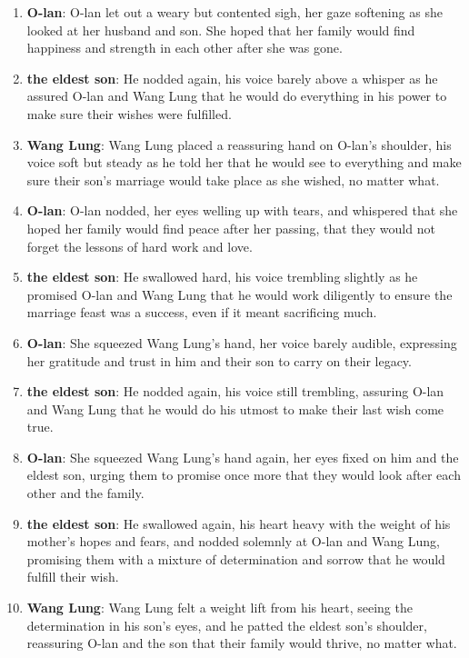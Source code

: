 \documentclass[10pt]{article}
\begin{document}
\begin{enumerate}
\item \textbf{O-lan}: O-lan let out a weary but contented sigh, her gaze softening as she looked at her husband and son. She hoped that her family would find happiness and strength in each other after she was gone.

\item \textbf{the eldest son}: He nodded again, his voice barely above a whisper as he assured O-lan and Wang Lung that he would do everything in his power to make sure their wishes were fulfilled.

\item \textbf{Wang Lung}: Wang Lung placed a reassuring hand on O-lan's shoulder, his voice soft but steady as he told her that he would see to everything and make sure their son's marriage would take place as she wished, no matter what.

\item \textbf{O-lan}: O-lan nodded, her eyes welling up with tears, and whispered that she hoped her family would find peace after her passing, that they would not forget the lessons of hard work and love.

\item \textbf{the eldest son}: He swallowed hard, his voice trembling slightly as he promised O-lan and Wang Lung that he would work diligently to ensure the marriage feast was a success, even if it meant sacrificing much.

\item \textbf{O-lan}: She squeezed Wang Lung's hand, her voice barely audible, expressing her gratitude and trust in him and their son to carry on their legacy.

\item \textbf{the eldest son}: He nodded again, his voice still trembling, assuring O-lan and Wang Lung that he would do his utmost to make their last wish come true.

\item \textbf{O-lan}: She squeezed Wang Lung's hand again, her eyes fixed on him and the eldest son, urging them to promise once more that they would look after each other and the family.

\item \textbf{the eldest son}: He swallowed again, his heart heavy with the weight of his mother's hopes and fears, and nodded solemnly at O-lan and Wang Lung, promising them with a mixture of determination and sorrow that he would fulfill their wish.

\item \textbf{Wang Lung}: Wang Lung felt a weight lift from his heart, seeing the determination in his son's eyes, and he patted the eldest son's shoulder, reassuring O-lan and the son that their family would thrive, no matter what.


\end{enumerate}
\end{document}

